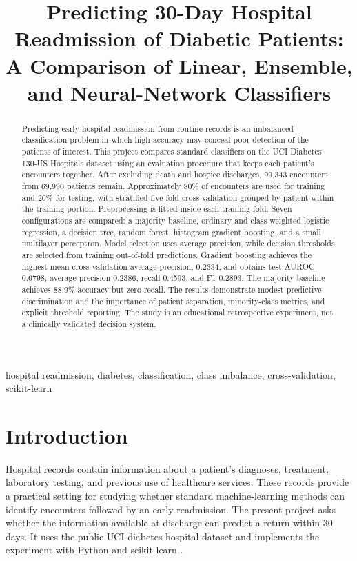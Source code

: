 \documentclass[conference]{IEEEtran}
\title{Predicting 30-Day Hospital Readmission of Diabetic Patients: A Comparison of Linear, Ensemble, and Neural-Network Classifiers}
\author{\IEEEauthorblockN{Joud Tutanji, Rakan Al-Shishani, Mohammad Khalil}
\IEEEauthorblockA{Artificial Intelligence and Machine Learning Course Project}}
\begin{document}
\maketitle

\begin{abstract}
Predicting early hospital readmission from routine records is an imbalanced classification problem in which high accuracy may conceal poor detection of the patients of interest. This project compares standard classifiers on the UCI Diabetes 130-US Hospitals dataset using an evaluation procedure that keeps each patient's encounters together. After excluding death and hospice discharges, 99,343 encounters from 69,990 patients remain. Approximately 80\% of encounters are used for training and 20\% for testing, with stratified five-fold cross-validation grouped by patient within the training portion. Preprocessing is fitted inside each training fold. Seven configurations are compared: a majority baseline, ordinary and class-weighted logistic regression, a decision tree, random forest, histogram gradient boosting, and a small multilayer perceptron. Model selection uses average precision, while decision thresholds are selected from training out-of-fold predictions. Gradient boosting achieves the highest mean cross-validation average precision, 0.2334, and obtains test AUROC 0.6798, average precision 0.2386, recall 0.4593, and F1 0.2893. The majority baseline achieves 88.9\% accuracy but zero recall. The results demonstrate modest predictive discrimination and the importance of patient separation, minority-class metrics, and explicit threshold reporting. The study is an educational retrospective experiment, not a clinically validated decision system.
\end{abstract}

\begin{IEEEkeywords}
hospital readmission, diabetes, classification, class imbalance, cross-validation, scikit-learn
\end{IEEEkeywords}

\section{Introduction}
Hospital records contain information about a patient's diagnoses, treatment, laboratory testing, and previous use of healthcare services. These records provide a practical setting for studying whether standard machine-learning methods can identify encounters followed by an early readmission. The present project asks whether the information available at discharge can predict a return within 30 days. It uses the public UCI diabetes hospital dataset \cite{uci} and implements the experiment with Python and scikit-learn \cite{sklearn}.
\end{document}
